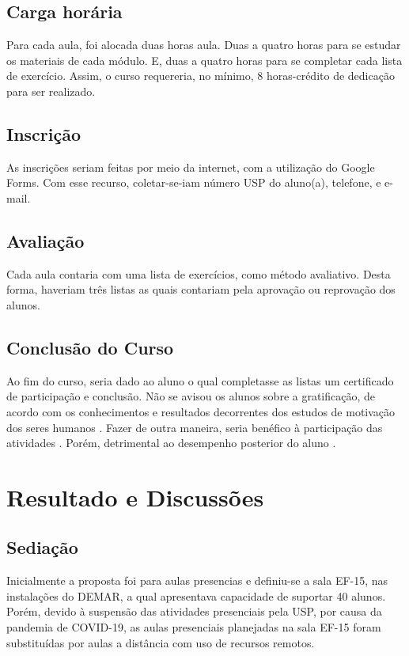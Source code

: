 \documentclass[
12pt,				%
openright,			%
oneside,			%
a4paper,			%
english,			%
french,				%
spanish,			%
brazil,				%
]{abntex2}
\begin{document}
\section{Carga horária}
Para cada aula, foi alocada duas horas aula. Duas a quatro horas para se estudar
os materiais de cada módulo. E, duas a quatro horas para se completar cada lista
de exercício. Assim, o curso requereria, no mínimo, 8 horas-crédito de dedicação para ser realizado.
\section{Inscrição}

As inscrições seriam feitas por meio da internet, com a utilização do Google Forms.
Com esse recurso, coletar-se-iam número USP do aluno(a), telefone, e e-mail.

\section{Avaliação}
Cada aula contaria com uma lista de exercícios, como método avaliativo. Desta forma,
haveriam três listas as quais contariam pela aprovação ou reprovação dos alunos.

\section{Conclusão do Curso}

Ao fim do curso, seria dado ao aluno o qual completasse as listas um certificado
de participação e conclusão. Não se avisou os alunos sobre a gratificação, de
acordo com os conhecimentos e resultados decorrentes dos estudos de motivação
dos seres humanos \cite{deci2017self}. Fazer de outra maneira,
seria benéfico à participação das atividades \cite{hendijani2016intrinsic}.
Porém, detrimental ao desempenho posterior do aluno \cite{ariely2009large}.

\chapter{Resultado e Discussões}

\section{Sediação}
Inicialmente a proposta foi para aulas presencias e definiu-se a sala EF-15, nas instalações do DEMAR, a qual apresentava capacidade de suportar 40 alunos. Porém, devido à
suspensão das atividades presenciais pela USP, por causa da pandemia de
COVID-19, as aulas presenciais planejadas na sala EF-15 foram
substituídas por aulas a distância com uso de recursos
remotos.
\end{document}
